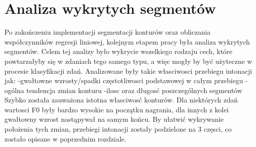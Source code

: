 \documentclass[a4paper,12 pt]{article}
\begin{document}
\section{Analiza wykrytych segmentów}
Po zakończeniu implementacji segmentacji konturów oraz obliczania współczynników regresji liniowej, kolejnym etapem pracy była analiza wykrytych segmentów. Celem tej analizy było wykrycie wszelkiego rodzaju cech, które powtarzałyby się w zdaniach tego samego typu, a więc mogły by być użyteczne w procesie klasyfikacji zdań. 
Analizowane były takie własciwosci przebiegu intonacji jak:
\newline-gwałtowne wzrosty/spadki częstotliwosci podstawowej w całym przebiegu 
\newline-ogólna tendencja zmian konturu
\newline-ilosc oraz długosć poszczególnych segmentów
\newline Szybko została zauważona istotna własciwosć konturów. Dla niektórych zdań wartosci F0 były bardzo wysokie na początku nagrania, dla innych z kolei gwałtowny wzrost nastąpywał na samym końcu.
By ułatwić wykrywanie położenia tych zmian, przebiegi intonacji zostały podzielone na 3 częsci, co zostało opisane w poprzednim rozdziale.
\end{document}
